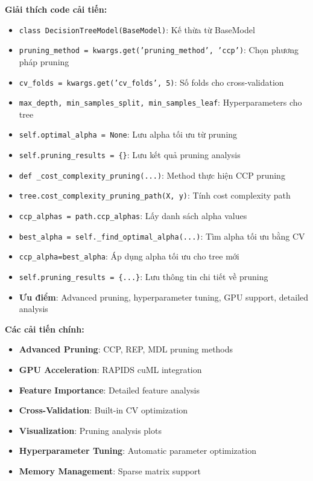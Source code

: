 \textbf{Giải thích code cải tiến:}
\begin{itemize}
    \item \texttt{class DecisionTreeModel(BaseModel)}: Kế thừa từ BaseModel
    \item \texttt{pruning\_method = kwargs.get('pruning\_method', 'ccp')}: Chọn phương pháp pruning
    \item \texttt{cv\_folds = kwargs.get('cv\_folds', 5)}: Số folds cho cross-validation
    \item \texttt{max\_depth, min\_samples\_split, min\_samples\_leaf}: Hyperparameters cho tree
    \item \texttt{self.optimal\_alpha = None}: Lưu alpha tối ưu từ pruning
    \item \texttt{self.pruning\_results = \{\}}: Lưu kết quả pruning analysis
    \item \texttt{def \_cost\_complexity\_pruning(...)}: Method thực hiện CCP pruning
    \item \texttt{tree.cost\_complexity\_pruning\_path(X, y)}: Tính cost complexity path
    \item \texttt{ccp\_alphas = path.ccp\_alphas}: Lấy danh sách alpha values
    \item \texttt{best\_alpha = self.\_find\_optimal\_alpha(...)}: Tìm alpha tối ưu bằng CV
    \item \texttt{ccp\_alpha=best\_alpha}: Áp dụng alpha tối ưu cho tree mới
    \item \texttt{self.pruning\_results = \{...\}}: Lưu thông tin chi tiết về pruning
    \item \textbf{Ưu điểm}: Advanced pruning, hyperparameter tuning, GPU support, detailed analysis
\end{itemize}

\textbf{Các cải tiến chính:}
\begin{itemize}
    \item \textbf{Advanced Pruning}: CCP, REP, MDL pruning methods
    \item \textbf{GPU Acceleration}: RAPIDS cuML integration
    \item \textbf{Feature Importance}: Detailed feature analysis
    \item \textbf{Cross-Validation}: Built-in CV optimization
    \item \textbf{Visualization}: Pruning analysis plots
    \item \textbf{Hyperparameter Tuning}: Automatic parameter optimization
    \item \textbf{Memory Management}: Sparse matrix support
\end{itemize}


